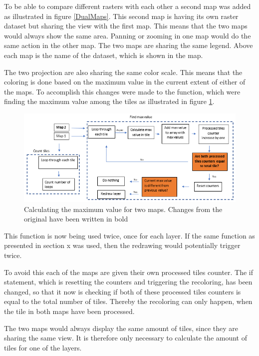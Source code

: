 To be able to compare different rasters with each other a second map was added as illustrated in figure \ref{DualMaps}. This second map is having its own raster dataset but sharing the view with the first map. This means that the two maps would always show the same area. Panning or zooming in one map would do the same action in the other map. The two maps are sharing the same legend. Above each map is the name of the dataset, which is shown in the map.  

The two projection are also sharing the same color scale. This means that the coloring is done based on the maximum value in the current extent of either of the maps. To accomplish this changes were made to the function, which were finding the maximum value among the tiles as illustrated in figure \ref{ChangeToMaxCalculation}.
 
\begin{figure} [H]
	\centering
	\includegraphics[width=1\textwidth]{Pictures/ChangeToMaxCalculation}
	\caption{Calculating the maximum value for two maps. Changes from the original have been written in bold}
	\label{ChangeToMaxCalculation}
\end{figure}

This function is now being used twice, once for each layer. If the same function as presented in section x was used, then the redrawing would potentially trigger twice. 

To avoid this each of the maps are given their own processed tiles counter. The if statement, which is resetting the counters and triggering the recoloring, has been changed, so that it now is checking if both of these processed tiles counters is equal to the total number of tiles. Thereby the recoloring can only happen, when the tile in both maps have been processed. 

The two maps would always display the same amount of tiles, since they are sharing the same view. It is therefore only necessary to calculate the amount of tiles for one of the layers. 

